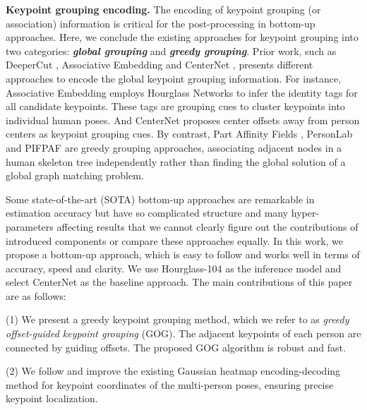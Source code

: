 \documentclass{article}
\begin{document}
\textbf{Keypoint grouping encoding.}
The encoding of keypoint grouping (or association) information is critical for the post-processing in bottom-up approaches. 
Here, we conclude the existing approaches for keypoint grouping into two categories: \textbf{\textit{global grouping}} and \textbf{\textit{greedy grouping}}. Prior work, such as DeeperCut \cite{Insafutdinov2016DeeperCut}, Associative Embedding \cite{Newell2017Associative} and CenterNet \cite{Zhou:2019ta}, presents different approaches to encode the global keypoint grouping information. For instance, Associative Embedding employs Hourglass Networks \cite{Newell2016Stacked} to infer the identity tags for all candidate keypoints. These tags are grouping cues to cluster keypoints into individual human poses. And CenterNet \cite{Zhou:2019ta} proposes center offsets away from person centers as keypoint grouping cues. By contrast, Part Affinity Fields \cite{Cao2017Realtime}, PersonLab \cite{Papandreou2018PersonLab} and PIFPAF \cite{kreiss2019pifpaf} are greedy grouping approaches, associating adjacent nodes in a human skeleton tree independently rather than finding the global solution of a global graph matching problem. 




Some state-of-the-art (SOTA) bottom-up approaches are remarkable in estimation accuracy but have so complicated structure and many hyper-parameters affecting results that we cannot clearly figure out the contributions of introduced components or compare these approaches equally. 
In this work, we propose a bottom-up approach, which is easy to follow and works well in terms of accuracy, speed and clarity. We use Hourglass-104 \cite{law2018cornernet} as the inference model and select CenterNet \cite{Zhou:2019ta} as the baseline approach.  The main contributions of this paper are as follows:

(1) We present a greedy keypoint grouping method, which we refer to as \textit{greedy offset-guided keypoint grouping} (GOG). The adjacent keypoints of each person are connected by guiding offsets. The proposed GOG algorithm is robust and fast.

(2) We follow and improve the existing Gaussian heatmap encoding-decoding method for keypoint coordinates of the multi-person poses, ensuring precise keypoint localization. 
\end{document}
